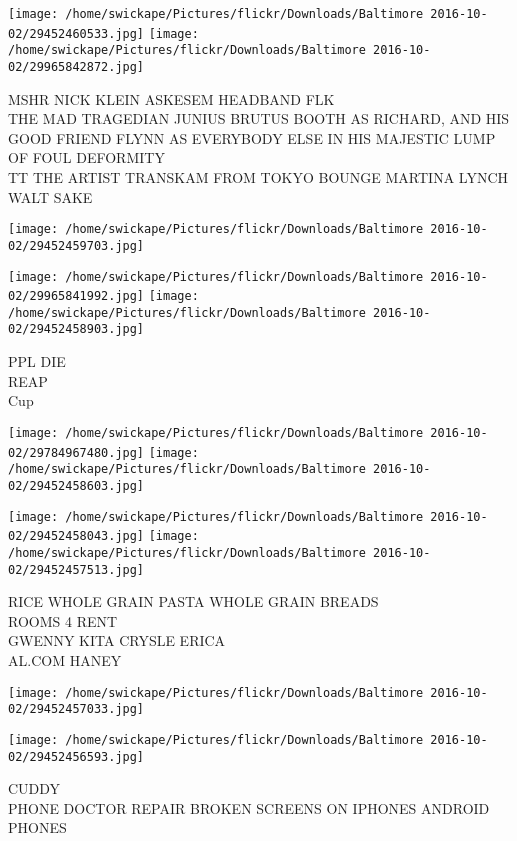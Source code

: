 \documentclass[10pt,letterpaper]{article}
\begin{document}
\texttt{[image: /home/swickape/Pictures/flickr/Downloads/Baltimore 2016-10-02/29452460533.jpg]}
\texttt{[image: /home/swickape/Pictures/flickr/Downloads/Baltimore 2016-10-02/29965842872.jpg]}

MSHR NICK KLEIN ASKESEM HEADBAND FLK\\
THE MAD TRAGEDIAN JUNIUS BRUTUS BOOTH AS RICHARD, AND HIS GOOD FRIEND FLYNN AS EVERYBODY ELSE IN HIS MAJESTIC LUMP OF FOUL DEFORMITY\\
TT THE ARTIST TRANSKAM FROM TOKYO BOUNGE MARTINA LYNCH\\
WALT SAKE
\pagebreak

\texttt{[image: /home/swickape/Pictures/flickr/Downloads/Baltimore 2016-10-02/29452459703.jpg]}

\vspace{0.25in}
\texttt{[image: /home/swickape/Pictures/flickr/Downloads/Baltimore 2016-10-02/29965841992.jpg]}
\texttt{[image: /home/swickape/Pictures/flickr/Downloads/Baltimore 2016-10-02/29452458903.jpg]}

PPL DIE\\
REAP\\
Cup
\pagebreak

\texttt{[image: /home/swickape/Pictures/flickr/Downloads/Baltimore 2016-10-02/29784967480.jpg]}
\texttt{[image: /home/swickape/Pictures/flickr/Downloads/Baltimore 2016-10-02/29452458603.jpg]}

\texttt{[image: /home/swickape/Pictures/flickr/Downloads/Baltimore 2016-10-02/29452458043.jpg]}
\texttt{[image: /home/swickape/Pictures/flickr/Downloads/Baltimore 2016-10-02/29452457513.jpg]}

RICE WHOLE GRAIN PASTA WHOLE GRAIN BREADS\\
ROOMS 4 RENT\\
GWENNY KITA CRYSLE ERICA\\
AL.COM HANEY
\pagebreak

\texttt{[image: /home/swickape/Pictures/flickr/Downloads/Baltimore 2016-10-02/29452457033.jpg]}

\vspace{0.25in}
\texttt{[image: /home/swickape/Pictures/flickr/Downloads/Baltimore 2016-10-02/29452456593.jpg]}

CUDDY\\
PHONE DOCTOR REPAIR BROKEN SCREENS ON IPHONES ANDROID PHONES
\pagebreak
\end{document}
